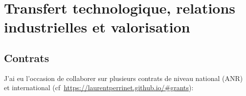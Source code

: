 \documentclass[10pt,french,a4paper,oneside]{article}%
\begin{document}
\section{Transfert technologique, relations industrielles et valorisation} %


\subsection{Contrats} %
J'ai eu l'occasion de collaborer sur plusieurs contrats de niveau national (ANR) et international (cf~\url{https://laurentperrinet.github.io/#grants}):
\end{document}
